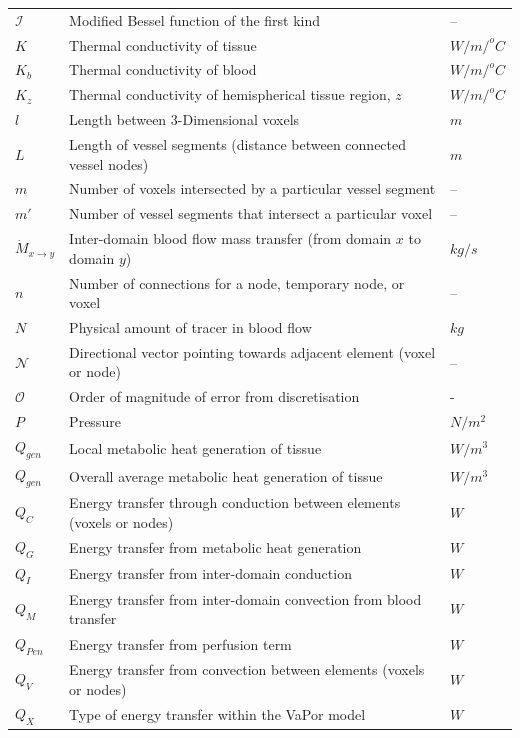 \documentclass[11pt,english,a4paper,twoside,openright]{report}
\begin{document}
{{{\begin{center}
\begin{longtable}[H]{L{0.1\textwidth} L{0.50\textwidth} R{0.15\textwidth}}
		$\mathcal{I}$ & Modified Bessel function of the first kind & --\\
		$K$ & Thermal conductivity of tissue & $W/m/^{o}C$ \\
		$K_{b}$ & Thermal conductivity of blood & $W/m/^{o}C$ \\
		$K_{z}$ & Thermal conductivity of hemispherical tissue region, $z$ & $W/m/^{o}C$ \\
		$l$ & Length between 3-Dimensional voxels & $m$ \\
		$L$ & Length of vessel segments (distance between connected vessel nodes) & $m$ \\
		$m$ & Number of voxels intersected by a particular vessel segment & -- \\
		$m'$ & Number of vessel segments that intersect a particular voxel & -- \\
		$\dot{M}_{x\rightarrow y}$ & Inter-domain blood flow mass transfer (from domain $x$ to domain $y$) & $kg/s$ \\
		$n$ & Number of connections for a node, temporary node, or voxel & -- \\
		$N$ & Physical amount of tracer in blood flow & $kg$ \\
		$\mathcal{N}$ & Directional vector pointing towards adjacent element (voxel or node) & -- \\
		$\mathcal{O}$ & Order of magnitude of error from discretisation & - \\
		$P$ & Pressure & $N/m^2$ \\
		$Q_{gen}$ & Local metabolic heat generation of tissue & $W/m^3$ \\
		$Q_{gen}$ & Overall average metabolic heat generation of tissue & $W/m^3$ \\
		$Q_{C}$ & Energy transfer through conduction between elements (voxels or nodes) & $W$ \\
		$Q_{G}$ & Energy transfer from metabolic heat generation & $W$ \\
		$Q_{I}$ & Energy transfer from inter-domain conduction & $W$ \\
		$Q_{M}$ & Energy transfer from inter-domain convection from blood transfer & $W$ \\
		$Q_{Pen}$ & Energy transfer from perfusion term & $W$ \\
		$Q_{V}$ & Energy transfer from convection between elements (voxels or nodes) & $W$ \\
		$Q_{X}$ & Type of energy transfer within the VaPor model & $W$ \\  

\end{longtable}
\end{center}}}}
\end{document}
